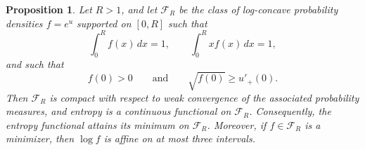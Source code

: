 \documentclass{article}
\theoremstyle{plain}
\newtheorem{proposition}[theorem]{Proposition}
\theoremstyle{definition}
\newcommand{\1}{\mathbf 1}
\begin{document}

\begin{proposition}%
\label{prop:existence-reduction}
Let \(R>1\), and let \(\mathcal F_R\) be the class of log-concave
probability densities \(f=e^u\) supported on \([0,R]\) such that
\[
\int_0^R f(x)\,dx=1,
\qquad
\int_0^R xf(x)\,dx=1,
\]
and such that
\[
f(0)>0
\qquad\text{and}\qquad
\sqrt{f(0)}\geq u'_+(0).
\]
Then \(\mathcal F_R\) is compact with respect to weak convergence of the associated probability measures,
and entropy is a continuous functional on \(\mathcal F_R\). Consequently, the entropy functional attains its minimum on
\(\mathcal F_R\). Moreover, if \(f\in\mathcal F_R\) is a minimizer,
then \(\log f\) is affine on at most three intervals.
\end{proposition}
\end{document}
